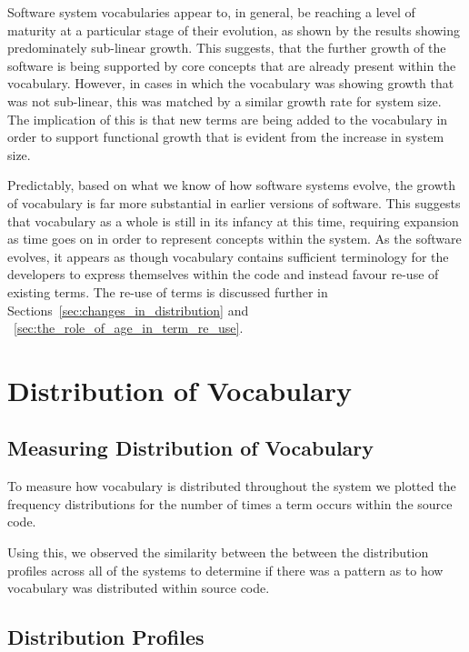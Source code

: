 Software system vocabularies appear to, in general, be reaching a level of maturity at a particular stage of their evolution, as shown by the results showing predominately sub-linear growth. This suggests, that the further growth of the software is being supported by core concepts that are already present within the vocabulary. However, in cases in which the vocabulary was showing growth that was not sub-linear, this was matched by a similar growth rate for system size. The implication of this is that new terms are being added to the vocabulary in order to support functional growth that is evident from the increase in system size.

Predictably, based on what we know of how software systems evolve, the growth of vocabulary is far more substantial in earlier versions of software. This suggests that vocabulary as a whole is still in its infancy at this time, requiring expansion as time goes on in order to represent concepts within the system. As the software evolves, it appears as though vocabulary contains sufficient terminology for the developers to express themselves within the code and instead favour re-use of existing terms. The re-use of terms is discussed further in Sections~\ref{sec:changes_in_distribution} and ~\ref{sec:the_role_of_age_in_term_re_use}.


\section{Distribution of Vocabulary} %
\label{sec:distribution_of_vocabulary}

\subsection{Measuring Distribution of Vocabulary} %
\label{sub:measuring_distribution_of_vocabulary}

To measure how vocabulary is distributed throughout the system we plotted the frequency distributions for the number of times a term occurs within the source code.

Using this, we observed the similarity between the between the distribution profiles across all of the systems to determine if there was a pattern as to how vocabulary was distributed within source code.


\subsection{Distribution Profiles} %
\label{sub:distribution_profiles}

